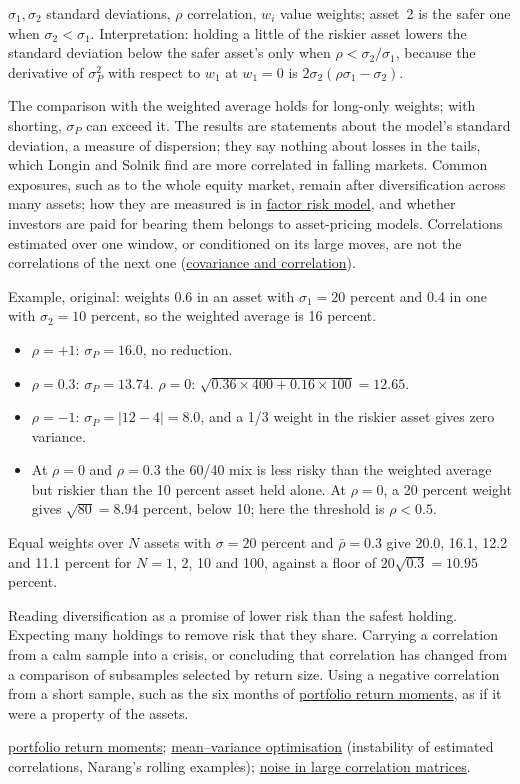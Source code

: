 \begin{qfmechanism}
 $\sigma_1,\sigma_2$ standard deviations, $\rho$ correlation, $w_i$ value weights; asset~2 is the safer one when $\sigma_2<\sigma_1$. Interpretation: holding a little of the riskier asset lowers the standard deviation below the safer asset's only when $\rho<\sigma_2/\sigma_1$, because the derivative of $\sigma_P^2$ with respect to $w_1$ at $w_1=0$ is $2\sigma_2(\rho\sigma_1-\sigma_2)$.

 The comparison with the weighted average holds for long-only weights; with shorting, $\sigma_P$ can exceed it. The results are statements about the model's standard deviation, a measure of dispersion; they say nothing about losses in the tails, which Longin and Solnik find are more correlated in falling markets. Common exposures, such as to the whole equity market, remain after diversification across many assets; how they are measured is in \hyperref[mod:factor-risk-model]{factor risk model}, and whether investors are paid for bearing them belongs to asset-pricing models. Correlations estimated over one window, or conditioned on its large moves, are not the correlations of the next one (\hyperref[def:return-dependence]{covariance and correlation}).

 Example, original: weights 0.6 in an asset with $\sigma_1=20$ percent and 0.4 in one with $\sigma_2=10$ percent, so the weighted average is 16 percent.
\begin{itemize}
\item $\rho=+1$: $\sigma_P=16.0$, no reduction.
\item $\rho=0.3$: $\sigma_P=13.74$. $\rho=0$: $\sqrt{0.36\times400+0.16\times100}=12.65$.
\item $\rho=-1$: $\sigma_P=|12-4|=8.0$, and a 1/3 weight in the riskier asset gives zero variance.
\item At $\rho=0$ and $\rho=0.3$ the 60/40 mix is less risky than the weighted average but riskier than the 10 percent asset held alone. At $\rho=0$, a 20 percent weight gives $\sqrt{80}=8.94$ percent, below 10; here the threshold is $\rho<0.5$.
\end{itemize}
Equal weights over $N$ assets with $\sigma=20$ percent and $\bar\rho=0.3$ give 20.0, 16.1, 12.2 and 11.1 percent for $N=1$, 2, 10 and 100, against a floor of $20\sqrt{0.3}=10.95$ percent.

 Reading diversification as a promise of lower risk than the safest holding. Expecting many holdings to remove risk that they share. Carrying a correlation from a calm sample into a crisis, or concluding that correlation has changed from a comparison of subsamples selected by return size. Using a negative correlation from a short sample, such as the six months of \hyperref[meth:portfolio-return-moments]{portfolio return moments}, as if it were a property of the assets.

 \hyperref[meth:portfolio-return-moments]{portfolio return moments}; \hyperref[mod:mean-variance-portfolio-optimisation]{mean--variance optimisation} (instability of estimated correlations, Narang's rolling examples); \hyperref[ev:correlation-matrix-noise]{noise in large correlation matrices}.

\end{qfmechanism}
